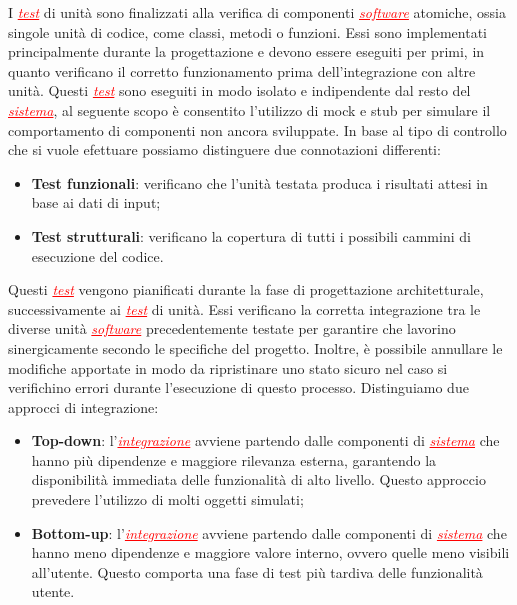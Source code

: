 I \textcolor{red}{\uline{\textit{test}}} di unità sono finalizzati alla verifica di componenti \textcolor{red}{\uline{\textit{software}}}
atomiche, ossia singole unità di codice, come classi, metodi o funzioni. Essi sono implementati principalmente durante la progettazione e
devono essere eseguiti per primi, in quanto verificano il corretto funzionamento prima dell'integrazione con altre unità. Questi
\textcolor{red}{\uline{\textit{test}}} sono eseguiti in modo isolato e indipendente dal resto del \textcolor{red}{\uline{\textit{sistema}}},
al seguente scopo è consentito l'utilizzo di mock e stub per simulare il comportamento di componenti non ancora sviluppate. In base al tipo
di controllo che si vuole efettuare possiamo distinguere due connotazioni differenti:
\begin{itemize}
    \item \textbf{Test funzionali}: verificano che l'unità testata produca i risultati attesi in base ai dati di input;
    \item \textbf{Test strutturali}: verificano la copertura di tutti i possibili cammini di esecuzione del codice.
\end{itemize}

Questi \textcolor{red}{\uline{\textit{test}}} vengono pianificati durante la fase di progettazione architetturale, successivamente ai 
\textcolor{red}{\uline{\textit{test}}} di unità. Essi verificano la corretta integrazione tra le diverse unità \textcolor{red}{\uline{\textit{software}}}
precedentemente testate per garantire che lavorino sinergicamente secondo le specifiche del progetto. Inoltre, è possibile annullare le modifiche
apportate in modo da ripristinare uno stato sicuro nel caso si verifichino errori durante l'esecuzione di questo processo. Distinguiamo
due approcci di integrazione:
\begin{itemize}
    \item \textbf{Top-down}: l'\textcolor{red}{\uline{\textit{integrazione}}} avviene partendo dalle componenti di \textcolor{red}{\uline{\textit{sistema}}}
        che hanno più dipendenze e maggiore rilevanza esterna, garantendo la disponibilità immediata delle funzionalità di alto livello.
        Questo approccio prevedere l'utilizzo di molti oggetti simulati;
    \item \textbf{Bottom-up}: l'\textcolor{red}{\uline{\textit{integrazione}}} avviene partendo dalle componenti di \textcolor{red}{\uline{\textit{sistema}}}
        che hanno meno dipendenze e maggiore valore interno, ovvero quelle meno visibili all'utente. Questo comporta una fase di test più tardiva
        delle funzionalità utente.
\end{itemize}

